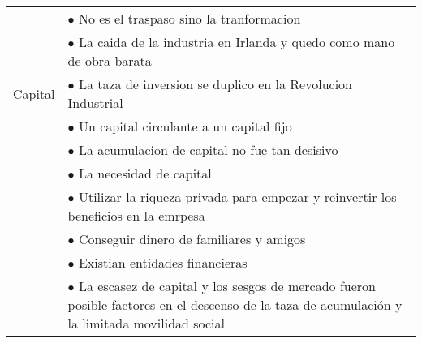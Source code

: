 \begin{tabular}{p{3cm}|p{11cm}}
          & $\bullet$ No es el traspaso sino la tranformacion                                                                                                       \\
          & $\bullet$ La caida de la industria en Irlanda y quedo como mano de obra barata                                                                          \\\hline
  Capital & $\bullet$ La taza de inversion se duplico en la Revolucion Industrial                                                                                   \\
          & $\bullet$ Un capital circulante a un capital fijo                                                                                                       \\
          & $\bullet$ La acumulacion de capital no fue tan desisivo                                                                                                 \\
          & $\bullet$ La necesidad de capital                                                                                                                       \\
          & \hspace{1cm} $\bullet$ Utilizar la riqueza privada para empezar y reinvertir los beneficios en la emrpesa                                               \\
          & \hspace{1cm} $\bullet$ Conseguir dinero de familiares y amigos                                                                                          \\
          & \hspace{1cm} $\bullet$ Existian entidades financieras                                                                                                   \\
          & $\bullet$ La escasez de capital y los sesgos de mercado fueron posible factores en el descenso de la taza de acumulación y la limitada movilidad social \\
\end{tabular}
\endgroup




